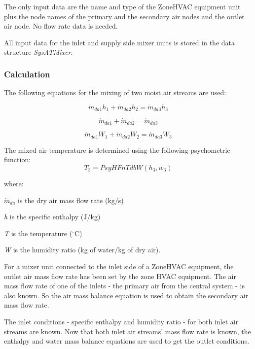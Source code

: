 The only input data are the name and type of the ZoneHVAC equipment unit plus the node names of the primary and the secondary air nodes and the outlet air node. No flow rate data is needed.

All input data for the inlet and supply side mixer units is stored in the data structure \emph{SysATMixer}.

\subsubsection{Calculation}\label{calculation-1-000}

The following equations for the mixing of two moist air streams are used:

\begin{equation}
{\dot m_{da1}}{h_1} + {\dot m_{da2}}{h_2} = {\dot m_{da3}}{h_3}
\end{equation}

\begin{equation}
{\dot m_{da1}} + {\dot m_{da2}} = {\dot m_{da3}}
\end{equation}

\begin{equation}
{\dot m_{da1}}{W_1} + {\dot m_{da2}}{W_2} = {\dot m_{da3}}{W_3}
\end{equation}

The mixed air temperature is determined using the following psychometric function:
\begin{equation}
{T_3} = PsyHFnTdbW({h_3}, {w_3})
\end{equation}

where:

\({\dot m_{da}}\) is the dry air mass flow rate (kg/s)

\emph{h} is the specific enthalpy (J/kg)

\emph{T} is the temperature (\(^{\circ}\)C)

\emph{W} is the humidity ratio (kg of water/kg of dry air).

For a mixer unit connected to the inlet side of a ZoneHVAC equipment, the outlet air mass flow rate has been set by the zone HVAC equipment. The air mass flow rate of one of the inlets - the primary air from the central system - is also known. So the air mass balance equation is used to obtain the secondary air mass flow rate. 

The inlet conditions - specific enthalpy and humidity ratio - for both inlet air streams are known. Now that both inlet air streams' mass flow rate is known, the enthalpy and water mass balance equations are used to get the outlet conditions.

